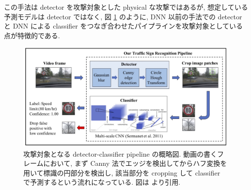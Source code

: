 この手法は detector を攻撃対象とした physical な攻撃ではあるが, 想定している予測モデルは detector ではなく, 図 \ref{fig:darts-pipeline} のように, DNN 以前の手法での detector と DNN による classifier をつなぎ合わせたパイプラインを攻撃対象としている点が特徴的である.
%
\begin{figure}[htbp]
\begin{center}
\includegraphics[width=14.0cm]{figures/darts-pipeline.pdf}
\end{center}
\caption{
攻撃対象となる detector-classifier pipeline の概略図.
動画の書くフレームにおいて, まず Canny 法でエッジを検出してからハフ変換を用いて標識の円部分を検出し, 該当部分を cropping して classifier で予測するという流れになっている.
図は \cite{sitawarin2018darts} より引用.
}
\label{fig:darts-pipeline}
\end{figure}
%

